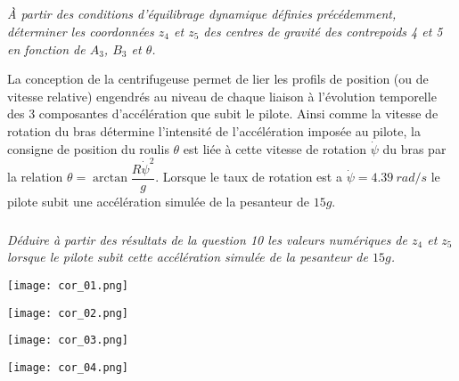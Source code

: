 \begin{multicols}{2}
\subparagraph{}
\textit{À partir des conditions d’équilibrage dynamique définies précédemment, déterminer les coordonnées
$z_4$ et $z_5$ des centres de gravité des contrepoids 4 et 5 en fonction de $A_3$, $B_3$ et $\theta$.
}
\ifprof
\begin{corrige}
\end{corrige}\else\fi

La conception de la centrifugeuse permet de lier les profils de position (ou de vitesse relative) engendrés au
niveau de chaque liaison à l’évolution temporelle des 3 composantes d’accélération que subit le pilote. Ainsi
comme la vitesse de rotation du bras détermine l’intensité de l’accélération imposée au pilote, la consigne
de position du roulis $\theta$ est liée à cette vitesse de rotation $\dot{\psi}$ du bras par la relation
$ \theta=\arctan\dfrac{R\dot{\psi}^2}{g}$. Lorsque le taux de rotation est a $\dot{\psi}=\SI{4,39}{rad/s}$ le pilote subit une accélération simulée de la pesanteur de $15g$.


\subparagraph{}
\textit{Déduire à partir des résultats de la question 10 les valeurs numériques de $z_4$ et $z_5$ lorsque le pilote
subit cette accélération simulée de la pesanteur de $15 g$.}

\end{multicols}

\fi

\ifprof

\begin{center}
\texttt{[image: cor\_01.png]}
\end{center}
\begin{center}
\texttt{[image: cor\_02.png]}
\end{center}
\begin{center}
\texttt{[image: cor\_03.png]}
\end{center}
\begin{center}
\texttt{[image: cor\_04.png]}
\end{center}
\else
\fi
